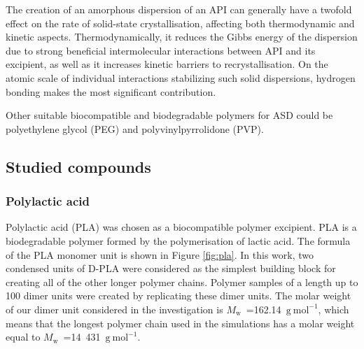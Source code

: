 The creation of an amorphous dispersion of an API can generally have a twofold effect on the rate of solid-state crystallisation, affecting both thermodynamic and kinetic aspects. Thermodynamically, it reduces the Gibbs energy of the dispersion due to strong beneficial intermolecular interactions between API and its excipient, as well as it increases kinetic barriers to recrystallisation. On the atomic scale of individual interactions stabilizing such solid dispersions, hydrogen bonding makes the most significant contribution. \cite{newman_what_2022}

Other suitable biocompatible and biodegradable polymers for ASD could be polyethylene glycol (PEG) and polyvinylpyrrolidone (PVP). \cite{klajmon_glass_2023}

\subsection{Studied compounds}
\subsubsection{Polylactic acid}
Polylactic acid (PLA) was chosen as a biocompatible polymer excipient.  PLA is a biodegradable polymer formed by the polymerisation of lactic acid. The formula of the PLA monomer unit is shown in Figure \ref{fig:pla}. In this work, two condensed units of D-PLA were considered as the simplest building block for creating all of the other longer polymer chains. Polymer samples of a length up to 100 dimer units were created by replicating these dimer units. The molar weight of our dimer unit considered in the investigation is $M_\mathrm{w}$~=162.14~$\mathrm{g\ mol^{-1}}$, which means that the longest polymer chain used in the simulations has a molar weight equal to  $M_\mathrm{w}$~=14~431~$\mathrm{g\ mol^{-1}}$.  

